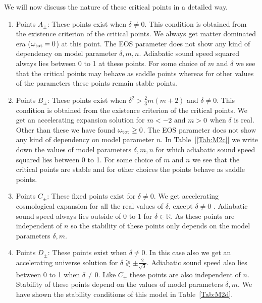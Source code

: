 \documentclass[a4paper,12pt]{article}
\begin{document}

We will now discuss the nature of these critical points in a detailed way.
\begin{enumerate}
\item Points $A_{\pm}$:  These points exist when  $\delta \neq 0$. This condition is obtained from the existence criterion of the critical points. We always get matter dominated era ($\omega_{\rm tot}=0$) at this point.  The EOS parameter does not show any kind of dependency on model parameter $\delta,m,n$.  Adiabatic sound speed squared always lies between 0 to 1 at these points. For some choice of $m$ and $\delta$ we see that the critical points may behave as saddle points whereas for other values of the parameters these points remain stable points. 
		
\item Points $B_{\pm}$: These points exist when  $\delta^2 > \frac23 m(m+2)$ and $\delta \neq 0$. This condition is obtained from the existence criterion of the critical points. We get an accelerating expansion solution for $m<-2 ~{\rm and}~ m>0$ when  $\delta$ is real.  Other than these we have found $\omega_{\rm tot}\geq0$. The EOS parameter does not show any kind of dependency on model parameter $n$. In Table~[\ref{Tab:M2c}] we write down the values of model parameters $\delta,m,n$ for which adiabatic sound speed squared lies between 0 to 1. For some choice of $m$ and $n$ we see that the critical points are stable and for other choices the points behave as saddle points. 		
		
\item Points $C_{\pm}$: These fixed points exist for $\delta \neq 0$.  We get accelerating cosmological expansion for all the real values of $\delta$, except $\delta \neq 0$ . Adiabatic sound speed always lies outside of 0 to 1 for $\delta \in \mathbb{R}$. As these points are independent of $n$ so the stability of these points only depends on the model parameters $\delta,m$.
		
\item Points $D_{\pm}$: These points exist when $\delta \neq 0$.  In this case also we get an accelerating universe solution for $ \delta \gtrless \pm \frac{2}{\sqrt{3}} $. Adiabatic sound speed also lies between 0 to 1 when $\delta \neq 0$. Like $C_{\pm}$ these points are also independent of $n$. Stability of these points depend on the values of model parameters $\delta,m$. We have shown the stability conditions of this model in Table~\ref{Tab:M2d}.
\end{enumerate}
\end{document}
